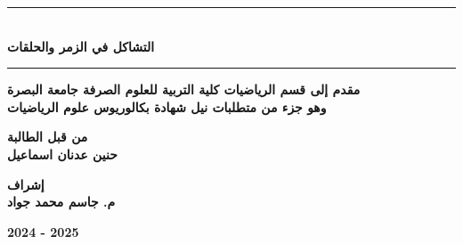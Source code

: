 \begin{titlepage}
	\vspace{1cm}
	
	\begin{center}
		\rule{100mm}{0.5mm}\\
		\vspace{1cm}
		\Large \textbf{التشاكل في الزمر والحلقات}\\
		\vspace{12pt}
		\rule{100mm}{0.5mm}
	\end{center}
	\vfill
	\begin{center}
		\large
		\textbf{مقدم إلى قسم الرياضيات كلية التربية للعلوم الصرفة جامعة البصرة\\
			\vspace{6pt}
			وهو جزء من متطلبات نيل شهادة بكالوريوس علوم الرياضيات}
	\end{center}
	\vfill
	\begin{center}
		\large
		\textbf{من قبل الطالبة}\\
		\vspace{8pt}
		 \large
		\textbf{حنين عدنان اسماعيل}
	\end{center}
	\vspace{10pt}
	\begin{center}
		\large
		\textbf{إشراف}\\
		\vspace{8pt}
		 \large
		\textbf{م. جاسم محمد جواد}
	\end{center}
	\vspace{10pt}
	\begin{center}
		\large 
		\textbf{2024 - 2025}
	\end{center}
\end{titlepage}
